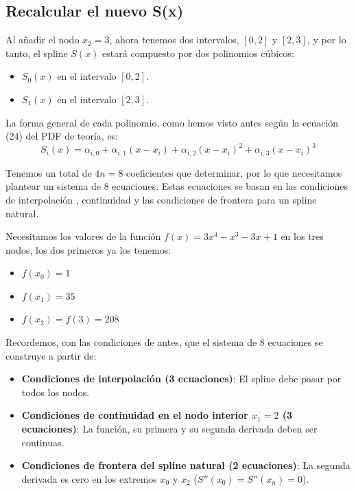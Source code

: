 \documentclass{article}
\begin{document}
\subsection{Recalcular el nuevo S(x)}

Al añadir el nodo $x_2=3$, ahora tenemos dos intervalos, $[0, 2]$ y $[2, 3]$, y por lo tanto, el spline $S(x)$ estará compuesto por dos polinomios cúbicos:
\begin{itemize}
    \item $S_0(x)$ en el intervalo $[0, 2]$.
    \item $S_1(x)$ en el intervalo $[2, 3]$.
\end{itemize}

La forma general de cada polinomio, como hemos visto antes según la ecuación (24) del PDF de teoría, es:
$$S_i(x) = \alpha_{i,0} + \alpha_{i,1}(x-x_i) + \alpha_{i,2}(x-x_i)^2 + \alpha_{i,3}(x-x_i)^3$$

Tenemos un total de $4n=8$ coeficientes que determinar, por lo que necesitamos plantear un sistema de 8 ecuaciones. Estas ecuaciones se basan en las condiciones de interpolación , continuidad  y las condiciones de frontera para un spline natural.


Necesitamos los valores de la función $f(x) = 3x^4 - x^3 - 3x + 1$ en los tres nodos, los dos primeros ya los tenemos:
\begin{itemize}
    \item $f(x_0) = 1$
    \item $f(x_1) = 35$
    \item $f(x_2) = f(3) = 208$
\end{itemize}

Recordemos, con las condiciones de antes, que el sistema de 8 ecuaciones se construye a partir de:
\begin{itemize}
    \item \textbf{Condiciones de interpolación (3 ecuaciones)}: El spline debe pasar por todos los nodos.
    \item \textbf{Condiciones de continuidad en el nodo interior $x_1=2$ (3 ecuaciones)}: La función, su primera y su segunda derivada deben ser continuas.
    \item \textbf{Condiciones de frontera del spline natural (2 ecuaciones)}: La segunda derivada es cero en los extremos $x_0$ y $x_2$ ($S''(x_0)=S''(x_n)=0$).
\end{itemize}
\end{document}
